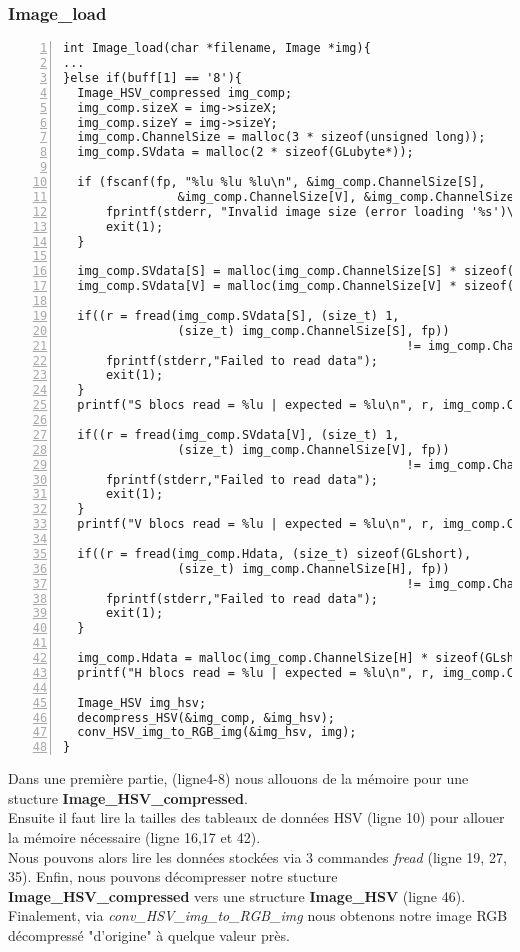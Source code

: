 \documentclass[12pt, letterpaper]{article}
\begin{document}
\subsubsection{Image\_load}
\begin{Verbatim}[numbers=left,xleftmargin = 5mm]
int Image_load(char *filename, Image *img){
...
}else if(buff[1] == '8'){
  Image_HSV_compressed img_comp;
  img_comp.sizeX = img->sizeX;
  img_comp.sizeY = img->sizeY;
  img_comp.ChannelSize = malloc(3 * sizeof(unsigned long));
  img_comp.SVdata = malloc(2 * sizeof(GLubyte*));

  if (fscanf(fp, "%lu %lu %lu\n", &img_comp.ChannelSize[S], 
                &img_comp.ChannelSize[V], &img_comp.ChannelSize[H]) != 3){
      fprintf(stderr, "Invalid image size (error loading '%s')\n", filename);
      exit(1);
  }
  
  img_comp.SVdata[S] = malloc(img_comp.ChannelSize[S] * sizeof(GLubyte));
  img_comp.SVdata[V] = malloc(img_comp.ChannelSize[V] * sizeof(GLubyte));
  
  if((r = fread(img_comp.SVdata[S], (size_t) 1, 
                (size_t) img_comp.ChannelSize[S], fp)) 
                                                != img_comp.ChannelSize[S] ){
      fprintf(stderr,"Failed to read data");
      exit(1);
  }
  printf("S blocs read = %lu | expected = %lu\n", r, img_comp.ChannelSize[S]);

  if((r = fread(img_comp.SVdata[V], (size_t) 1, 
                (size_t) img_comp.ChannelSize[V], fp))
                                                != img_comp.ChannelSize[V] ){
      fprintf(stderr,"Failed to read data");
      exit(1);
  }
  printf("V blocs read = %lu | expected = %lu\n", r, img_comp.ChannelSize[V]);

  if((r = fread(img_comp.Hdata, (size_t) sizeof(GLshort),
                (size_t) img_comp.ChannelSize[H], fp))
                                                != img_comp.ChannelSize[H]){
      fprintf(stderr,"Failed to read data");
      exit(1);
  }

  img_comp.Hdata = malloc(img_comp.ChannelSize[H] * sizeof(GLshort));
  printf("H blocs read = %lu | expected = %lu\n", r, img_comp.ChannelSize[H]);

  Image_HSV img_hsv;
  decompress_HSV(&img_comp, &img_hsv);
  conv_HSV_img_to_RGB_img(&img_hsv, img);
}

\end{Verbatim}
Dans une première partie, (ligne4-8) nous allouons de la mémoire pour une stucture
\textbf{Image\_HSV\_compressed}.\\
Ensuite il faut lire la tailles des tableaux de données HSV (ligne 10) pour allouer la mémoire nécessaire (ligne 16,17 et 42).\\
Nous pouvons alors lire les données stockées via 3 commandes \textit{fread} (ligne 19, 27, 35).
Enfin, nous pouvons décompresser notre stucture \\\textbf{Image\_HSV\_compressed} vers une structure \textbf{Image\_HSV} (ligne 46).\\
Finalement, via \textit{conv\_HSV\_img\_to\_RGB\_img} nous obtenons notre image RGB décompressé "d'origine" à quelque valeur près.
\end{document}
